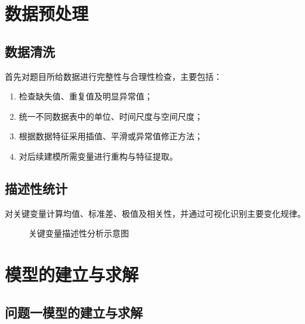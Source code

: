 \documentclass[UTF8,fontset=windows,a4paper,12pt]{ctexart}
\begin{document}

\section{数据预处理}

\subsection{数据清洗}

首先对题目所给数据进行完整性与合理性检查，主要包括：
\begin{enumerate}
  \item 检查缺失值、重复值及明显异常值；
  \item 统一不同数据表中的单位、时间尺度与空间尺度；
  \item 根据数据特征采用插值、平滑或异常值修正方法；
  \item 对后续建模所需变量进行重构与特征提取。
\end{enumerate}

\subsection{描述性统计}

对关键变量计算均值、标准差、极值及相关性，并通过可视化识别主要变化规律。

\begin{figure}[H]
  \centering
  \fbox{\rule{0pt}{4.5cm}\rule{0.78\textwidth}{0pt}}
  \caption{关键变量描述性分析示意图}
  \label{fig:eda}
\end{figure}


\section{模型的建立与求解}

\subsection{问题一模型的建立与求解}
\end{document}
